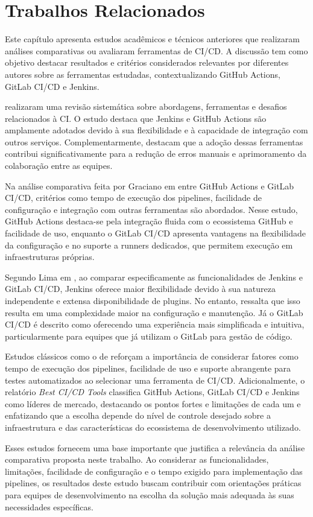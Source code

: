 \chapter{Trabalhos Relacionados}
\label{cap:trabalhos:relacionados}

Este capítulo apresenta estudos acadêmicos e técnicos anteriores que realizaram análises comparativas ou avaliaram ferramentas de CI/CD. A discussão tem como objetivo destacar resultados e critérios considerados relevantes por diferentes autores sobre as ferramentas estudadas, contextualizando GitHub Actions, GitLab CI/CD e Jenkins.

\cite{Shahin2017} realizaram uma revisão sistemática sobre abordagens, ferramentas e desafios relacionados à CI. O estudo destaca que Jenkins e GitHub Actions são amplamente adotados devido à sua flexibilidade e à capacidade de integração com outros serviços. Complementarmente, \cite{RiunguKalliosaari2016} destacam que a adoção dessas ferramentas contribui significativamente para a redução de erros manuais e aprimoramento da colaboração entre as equipes.

Na análise comparativa feita por Graciano em \cite{GRACIANOKAKINOHANA2023} entre GitHub Actions e GitLab CI/CD, critérios como tempo de execução dos pipelines, facilidade de configuração e integração com outras ferramentas são abordados. Nesse estudo, GitHub Actions destaca-se pela integração fluida com o ecossistema GitHub e facilidade de uso, enquanto o GitLab CI/CD apresenta vantagens na flexibilidade da configuração e no suporte a runners dedicados, que permitem execução em infraestruturas próprias.

Segundo Lima em \cite{Lima2021}, ao comparar especificamente as funcionalidades de Jenkins e GitLab CI/CD, Jenkins oferece maior flexibilidade devido à sua natureza independente e extensa disponibilidade de plugins. No entanto, ressalta que isso resulta em uma complexidade maior na configuração e manutenção. Já o GitLab CI/CD é descrito como oferecendo uma experiência mais simplificada e intuitiva, particularmente para equipes que já utilizam o GitLab para gestão de código.

Estudos clássicos como o de \cite{Duvall2007} reforçam a importância de considerar fatores como tempo de execução dos pipelines, facilidade de uso e suporte abrangente para testes automatizados ao selecionar uma ferramenta de CI/CD. Adicionalmente, o relatório \textit{Best CI/CD Tools} \cite{bluelightCo} classifica GitHub Actions, GitLab CI/CD e Jenkins como líderes de mercado, destacando os pontos fortes e limitações de cada um e enfatizando que a escolha depende do nível de controle desejado sobre a infraestrutura e das características do ecossistema de desenvolvimento utilizado.

Esses estudos fornecem uma base importante que justifica a relevância da análise comparativa proposta neste trabalho. Ao considerar as funcionalidades, limitações, facilidade de configuração e o tempo exigido para implementação das pipelines, os resultados deste estudo buscam contribuir com orientações práticas para equipes de desenvolvimento na escolha da solução mais adequada às suas necessidades específicas.
